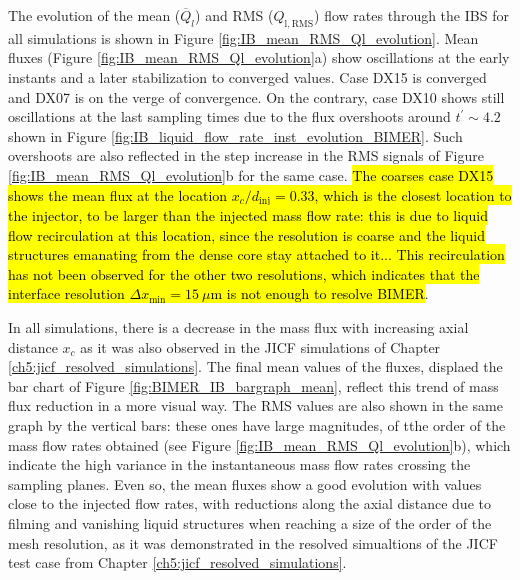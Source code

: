The evolution of the mean ($\overline{Q}_l$) and RMS ($Q_\mathrm{l,\mathrm{RMS}}$) flow rates through the IBS for all simulations is shown in Figure \ref{fig:IB_mean_RMS_Ql_evolution}. Mean fluxes (Figure \ref{fig:IB_mean_RMS_Ql_evolution}a) show oscillations at the early instants and a later stabilization to converged values. Case DX15 is converged and DX07 is on the verge of convergence. On the contrary, case DX10 shows still oscillations at the last sampling times due to the flux overshoots around $t^\prime \sim 4.2$ shown in Figure \ref{fig:IB_liquid_flow_rate_inst_evolution_BIMER}. Such overshoots are also reflected in the step increase in the RMS signals of Figure \ref{fig:IB_mean_RMS_Ql_evolution}b for the same case. \hl{The coarses case DX15 shows the mean flux at the location $x_c/d_\mathrm{inj} = 0.33$, which is the closest location to the injector, to be larger than the injected mass flow rate: this is due to liquid flow recirculation at this location, since the resolution is coarse and the liquid structures emanating from the dense core stay attached to it... This recirculation has not been observed for the other two resolutions, which indicates that the interface resolution $\Delta x_\mathrm{min} = 15~\mu $m is not enough to resolve BIMER}.

In all simulations, there is a decrease in the mass flux with increasing axial distance $x_c$ as it was also observed in the JICF simulations of Chapter \ref{ch5:jicf_resolved_simulations}. The final mean values of the fluxes, displaed the bar chart of Figure \ref{fig:BIMER_IB_bargraph_mean}, reflect this trend of mass flux reduction in a more visual way. The RMS values are also shown in the same graph by the vertical bars: these ones have large magnitudes, of tthe order of the mass flow rates obtained (see Figure \ref{fig:IB_mean_RMS_Ql_evolution}b), which indicate the high variance in the instantaneous mass flow rates crossing the sampling planes. Even so, the mean fluxes show a good evolution with values close to the injected flow rates, with reductions along the axial distance due to filming and vanishing liquid structures when reaching a size of the order of the mesh resolution, as it was demonstrated in the resolved simualtions of the JICF test case from Chapter \ref{ch5:jicf_resolved_simulations}.


